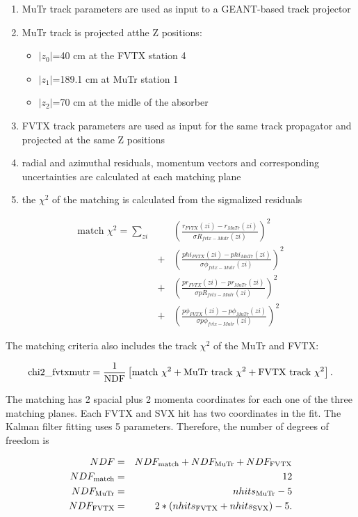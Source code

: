 \documentclass[12pt]{article}
\begin{document}
\begin{enumerate}
	\item MuTr track parameters are used as input to a GEANT-based track projector
	\item MuTr track is projected atthe Z positions:
	\begin{itemize}	
		\item $|z_0|$=40 cm at the FVTX station 4
		\item $|z_1|$=189.1 cm at MuTr station 1
		\item $|z_2|$=70 cm at the midle of the absorber
	\end{itemize}
	\item FVTX track parameters are used as input for the same track propagator and projected at the same Z positions
	\item radial and azimuthal residuals, momentum vectors and corresponding uncertainties are calculated at each matching plane
	\item the $\chi^2$ of the matching is calculated from the sigmalized residuals
\end{enumerate}

\begin{eqnarray}
\label{eq:match_chi2}
	\textrm {match } \chi^2 = \sum_{zi} && \left(\frac{r_{FVTX}(zi)-r_{MuTr}(zi)}{\sigma R_{fvtx-Mutr}(zi)}\right)^2\\\nonumber
	&+& \left(\frac{phi_{FVTX}(zi)-phi_{MuTr}(zi)}{\sigma\phi_{fvtx-Mutr}(zi)}\right)^2\\\nonumber
	&+& \left(\frac{pr_{FVTX}(zi)-pr_{MuTr}(zi)}{\sigma pR_{fvtx-Mutr}(zi)}\right)^2\\\nonumber
	&+& \left(\frac{p\phi_{FVTX}(zi)-p\phi_{MuTr}(zi)}{\sigma p\phi_{fvtx-Mutr}(zi)}\right)^2
\end{eqnarray}

The matching criteria also includes the track $\chi^2$ of the MuTr and FVTX:

\begin{equation}
\textrm{chi2\_fvtxmutr} = \frac{1}{\rm NDF} \left[ \textrm{match } \chi^2 + \textrm{MuTr track } \chi^2 + \textrm{FVTX track } \chi^2 \right].
\end{equation}

The matching has 2 spacial plus 2 momenta coordinates for each one of the three matching planes. Each FVTX and SVX hit has two coordinates in the fit. The Kalman filter 
fitting uses 5 parameters. Therefore, the number of degrees of freedom is

\begin{eqnarray}
	NDF &=& NDF_{\rm match} + NDF_{\rm MuTr} + NDF_{\rm FVTX}\\\nonumber
	NDF_{\rm match} &=& 12\\\nonumber
	NDF_{\rm MuTr} &=& nhits_{\rm MuTr} - 5\\\nonumber
	NDF_{\rm FVTX} &=& 2*(nhits_{\rm FVTX} + nhits_{\rm SVX}) -5.
\end{eqnarray}
\end{document}
